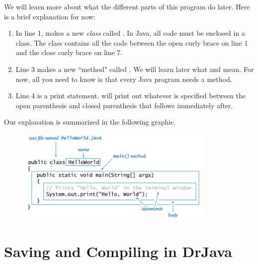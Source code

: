 We will learn more about what the different parts of this program do later. Here is a brief explanation for now:
\begin{enumerate}
\item In line 1,  makes a new \emph{class} called . In Java, all code must be enclosed in a class. The class contains all the code between the open curly brace \ic{\{} on line 1 and the close curly brace \ic{\}} on line 7.
\item Line 3 makes a new ``method" called . We will learn later what
 and  mean. For now, all you
need to know is that every Java program needs a  method.
\item Line 4 is a print statement.  will print out
whatever is specified between the open parenthesis \ic{(} and closed
parenthesis\ic{)} that follows immediately after.
\end{enumerate}

Our explanation is summarized in the following graphic.

\begin{figure}[ht]
	\centering
	\includegraphics[width=0.85\textwidth]{images/hello.png}
	\label{fig:helloworld:example}
\end{figure}


\section{Saving and Compiling in DrJava}

